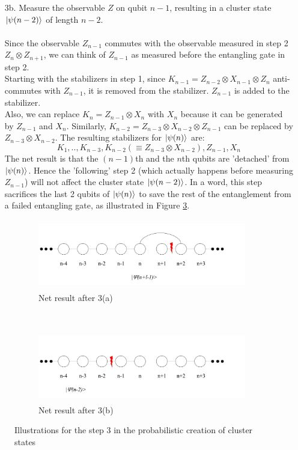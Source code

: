 \documentclass[letterpaper,10pt]{article}
\begin{document}
\begin{enumerate}
	\item[3b.] Measure the observable $Z$ on qubit $n-1$, resulting in a cluster state $\Ket{\psi(n-2)}$ of length $n-2$.\\ \\
	Since the observable $Z_{n-1}$ commutes with the observable measured in step 2 $Z_n \otimes Z_{n+1}$, we can think of $Z_{n-1}$ as measured before the entangling gate in step 2.\\
	Starting with the stabilizers in step 1, since $K_{n-1}=Z_{n-2}\otimes X_{n-1}\otimes Z_n$ anti-commutes with $Z_{n-1}$, it is removed from the stabilizer. $ Z_{n-1}$ is added to the stabilizer. \\
	Also, we can replace $K_n = Z_{n-1}\otimes X_n$ with $X_n$ because it can be generated by $ Z_{n-1}$ and $X_n$. Similarly, $K_{n-2} = Z_{n-3}\otimes X_{n-2}\otimes Z_{n-1}$ can be replaced by $Z_{n-3}\otimes X_{n-2}$. The resulting stabilizers for $\Ket{\psi(n)}$ are:
	\begin{equation}
		K_1,..,K_{n-3}, K_{n-2} (\equiv Z_{n-3}\otimes X_{n-2}), Z_{n-1}, X_n
	\end{equation}
	The net result is that the $(n-1)$th and the $n$th qubits are 'detached' from $\Ket{\psi(n)}$. Hence the 'following' step 2 (which actually happens before measuring $Z_{n-1}$) will not affect the cluster state $\Ket{\psi(n-2)}$. In a word, this step sacrifices the last 2 qubits of $\Ket{\psi(n)}$ to save the rest of the entanglement from a failed entangling gate, as illustrated in Figure \ref{fig:entangle_failure}.
\end{enumerate}

\begin{figure}[htp]
\centering
    \begin{subfigure}[t]{0.5\textwidth}
        \includegraphics[height=1.2in]{entangling_2.jpg}
        \caption{Net result after 3(a)}
        \label{fig:entangle_success}
    \end{subfigure}%
    \\ 
    \begin{subfigure}[t]{0.5\textwidth}
        \includegraphics[height=1.2in]{entangling_3.jpg}
        \caption{Net result after 3(b)}
        \label{fig:entangle_failure}
    \end{subfigure}%
\caption{Illustrations for the step 3 in the probabilistic creation of cluster states}

\end{figure}
\end{document}
